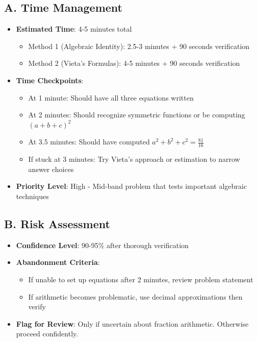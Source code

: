 \documentclass[12pt]{article}
\begin{document}
\begin{competitionbox}
\subsection*{A. Time Management}
\begin{itemize}[leftmargin=*]
    \item \textbf{Estimated Time}: 4-5 minutes total
    \begin{itemize}
        \item Method 1 (Algebraic Identity): 2.5-3 minutes + 90 seconds verification
        \item Method 2 (Vieta's Formulas): 4-5 minutes + 90 seconds verification
    \end{itemize}
    \item \textbf{Time Checkpoints}: 
    \begin{itemize}
        \item At 1 minute: Should have all three equations written
        \item At 2 minutes: Should recognize symmetric functions or be computing $(a+b+c)^2$
        \item At 3.5 minutes: Should have computed $a^2+b^2+c^2 = \frac{81}{16}$
        \item If stuck at 3 minutes: Try Vieta's approach or estimation to narrow answer choices
    \end{itemize}
    \item \textbf{Priority Level}: High - Mid-band problem that tests important algebraic techniques
\end{itemize}

\subsection*{B. Risk Assessment}
\begin{itemize}[leftmargin=*]
    \item \textbf{Confidence Level}: 90-95\% after thorough verification
    \item \textbf{Abandonment Criteria}: 
    \begin{itemize}
        \item If unable to set up equations after 2 minutes, review problem statement
        \item If arithmetic becomes problematic, use decimal approximations then verify
    \end{itemize}
    \item \textbf{Flag for Review}: Only if uncertain about fraction arithmetic. Otherwise proceed confidently.
\end{itemize}


\end{competitionbox}
\end{document}
